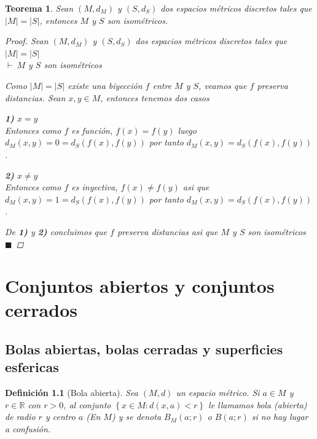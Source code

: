 \documentclass[oneside]{book} %
\theoremstyle{Teorema}
\newtheorem{Definicion}{Definición}[chapter]
\newtheorem{Teorema}[Definicion]{Teorema}
\theoremstyle{Ejemplos}
\theoremstyle{[Obs]}
\newcommand{\card}[1]{\left|#1\right|} %
\renewcommand{\{}{\left\lbrace} %
\renewcommand{\}}{\right\rbrace} %
\newcommand{\R}{\mathbb{R}} %
\renewcommand{\qed}{$\blacksquare$} %
\newcommand{\pd}{$\vdash\ $} %
\begin{document}
			\begin{Teorema}\setlength{\parindent}{0em}
			
				Sean $(M, d_M)$ y $(S, d_S)$ dos espacios métricos discretos tales que $\card{M} = \card{S}$, entonces $M$ y $S$ son isométricos.

				\begin{proof}
					
					Sean $(M, d_M)$ y $(S, d_S)$ dos espacios métricos discretos tales que $\card{M} = \card{S}$ \\ 
					\pd $M$ y $S$ son isométricos

					Como $\card{M} = \card{S}$ existe una biyección $f$ entre $M$ y $S$, veamos que $f$ preserva distancias. Sean $x, y \in M$, entonces tenemos dos casos 

					\textbf{1)} $x = y$ \\ 
					Entonces como $f$ es función, $f(x) = f(y)$ luego $d_{M}(x, y) = 0 = d_{S}(f(x), f(y))$ por tanto $d_{M}(x, y) = d_{S}(f(x), f(y))$.

					\textbf{2)} $x \neq y$ \\ 
					Entonces como $f$ es inyectiva, $f(x) \neq f(y)$ asi que $d_{M}(x, y) = 1 = d_{S}(f(x), f(y))$ por tanto $d_{M}(x, y) = d_{S}(f(x), f(y))$.

					De \textbf{1)} y \textbf{2)} concluimos que $f$ preserva distancias asi que $M$ y $S$ son isométricos \qed

				\end{proof}
			
			\end{Teorema}

	\chapter{Conjuntos abiertos y conjuntos cerrados}

		\section{Bolas abiertas, bolas cerradas y superficies esfericas}

			\begin{Definicion}[Bola abierta]\setlength{\parindent}{0em}
					
				Sea $(M, d)$ un espacio métrico. Si $a \in M$ y $r \in \R$ con $r > 0$, al conjunto $\{ x \in M : d(x, a) < r \}$ le llamamos bola (abierta) de radio $r$ y centro $a$ (En $M$) y se denota $B_M(a;r)$ o $B(a;r)$ si no hay lugar a confusión.

			\end{Definicion}
\end{document}
